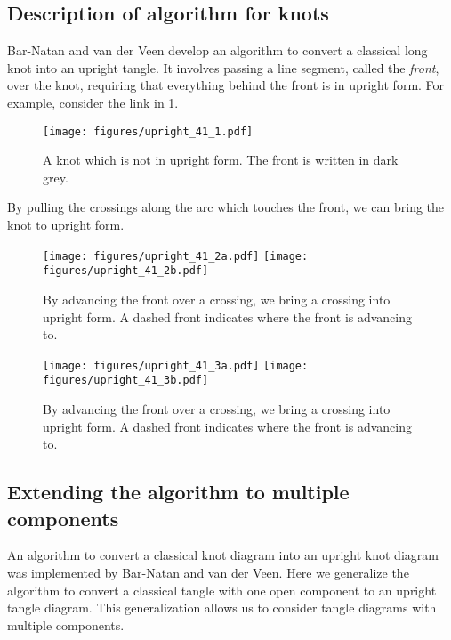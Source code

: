 
\subsection{Description of algorithm for knots}

Bar-Natan and van der Veen develop an algorithm to convert a classical long knot
into an upright tangle. It involves passing a line segment, called the
\emph{front}, over the knot, requiring that everything behind the front is in
upright form. For example, consider the link in \cref{fig:figures-upright_41_1}.
\begin{figure}[h]
        \centering
        \texttt{[image: figures/upright\_41\_1.pdf]}
        \caption{A knot which is not in upright form. The front is written in
        dark grey.}
        \label{fig:figures-upright_41_1}
\end{figure}
By pulling the crossings along the arc which touches the front, we can bring the
knot to upright form.
\begin{figure}[h]
        \centering
        \texttt{[image: figures/upright\_41\_2a.pdf]}
        \texttt{[image: figures/upright\_41\_2b.pdf]}
        \caption{By advancing the front over a crossing, we bring a crossing
        into upright form. A dashed front indicates where the front is advancing
        to.
        }
        \label{fig:figures-upright_41_2}
\end{figure}
\begin{figure}[h]
        \centering
        \texttt{[image: figures/upright\_41\_3a.pdf]}
        \texttt{[image: figures/upright\_41\_3b.pdf]}
        \caption{By advancing the front over a crossing, we bring a crossing
        into upright form. A dashed front indicates where the front is advancing
        to.
        }
        \label{fig:figures-upright_41_3}
\end{figure}

\subsection{Extending the algorithm to multiple components}

An algorithm to convert a classical knot diagram into an upright knot diagram
was implemented by Bar-Natan and van der Veen. Here we generalize the algorithm
to convert a classical tangle with one open component to an upright tangle
diagram. This generalization allows us to consider tangle diagrams with multiple
components.

